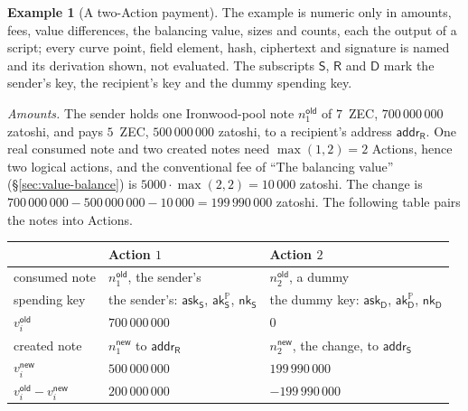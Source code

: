 \documentclass[11pt,a4paper]{article}
\theoremstyle{definition}
\newtheorem{example}[theorem]{Example}
\newcommand{\PP}{\mathbb{P}}
\newcommand{\ask}{\ensuremath{\mathsf{ask}}}
\newcommand{\aksym}{\ensuremath{\mathsf{ak}}}
\newcommand{\nksym}{\ensuremath{\mathsf{nk}}}
\begin{document}
\begin{example}[A two-Action payment]\label{ex:payment}
The example is numeric only in amounts, fees, value differences, the
balancing value, sizes and counts, each the output of a script; every curve
point, field element, hash, ciphertext and signature is named and its
derivation shown, not evaluated. The subscripts $\mathsf{S}$, $\mathsf{R}$
and $\mathsf{D}$ mark the sender's key, the recipient's key and the dummy
spending key.

\emph{Amounts.} The sender holds one Ironwood-pool note
$n^{\mathsf{old}}_1$ of $7$~ZEC, $700\,000\,000$ zatoshi, and pays $5$~ZEC,
$500\,000\,000$ zatoshi, to a recipient's address $\mathsf{addr}_{\mathsf{R}}$.
One real consumed note and two created notes need $\max(1, 2) = 2$ Actions,
hence two logical actions, and the conventional fee of ``The balancing
value'' (\S\ref{sec:value-balance}) is $5000 \cdot \max(2, 2) = 10\,000$
zatoshi. The change is
$700\,000\,000 - 500\,000\,000 - 10\,000 = 199\,990\,000$ zatoshi.
The following table pairs the notes into Actions.

\begin{center}\small
\setlength{\tabcolsep}{5pt}
\begin{tabular}{@{}lll@{}}
\toprule
 & Action $1$ & Action $2$ \\
\midrule
consumed note & $n^{\mathsf{old}}_1$, the sender's & $n^{\mathsf{old}}_2$,
  a dummy \\
spending key & the sender's: $\ask_{\mathsf{S}}$,
  $\aksym^{\PP}_{\mathsf{S}}$, $\nksym_{\mathsf{S}}$
  & the dummy key: $\ask_{\mathsf{D}}$, $\aksym^{\PP}_{\mathsf{D}}$,
  $\nksym_{\mathsf{D}}$ \\
$v^{\mathsf{old}}_i$ & $700\,000\,000$ & $0$ \\
created note & $n^{\mathsf{new}}_1$ to $\mathsf{addr}_{\mathsf{R}}$
  & $n^{\mathsf{new}}_2$, the change, to $\mathsf{addr}_{\mathsf{S}}$ \\
$v^{\mathsf{new}}_i$ & $500\,000\,000$ & $199\,990\,000$ \\
$v^{\mathsf{old}}_i - v^{\mathsf{new}}_i$ & $200\,000\,000$
  & $-199\,990\,000$ \\
\bottomrule
\end{tabular}
\end{center}


\end{example}
\end{document}
